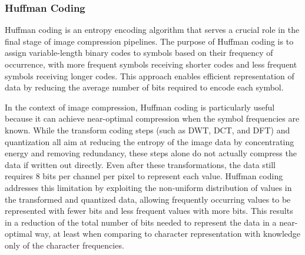 
\subsubsection{Huffman Coding}

Huffman coding is an entropy encoding algorithm that serves a crucial role in the final stage of image compression pipelines. The purpose of Huffman coding is to assign variable-length binary codes to symbols based on their frequency of occurrence, with more frequent symbols receiving shorter codes and less frequent symbols receiving longer codes. This approach enables efficient representation of data by reducing the average number of bits required to encode each symbol.

In the context of image compression, Huffman coding is particularly useful because it can achieve near-optimal compression when the symbol frequencies are known. While the transform coding steps (such as DWT, DCT, and DFT) and quantization all aim at reducing the entropy of the image data by concentrating energy and removing redundancy, these steps alone do not actually compress the data if written out directly. Even after these transformations, the data still requires 8 bits per channel per pixel to represent each value. Huffman coding addresses this limitation by exploiting the non-uniform distribution of values in the transformed and quantized data, allowing frequently occurring values to be represented with fewer bits and less frequent values with more bits. This results in a reduction of the total number of bits needed to represent the data in a near-optimal way, at least when comparing to character representation with knowledge only of the character frequencies.

